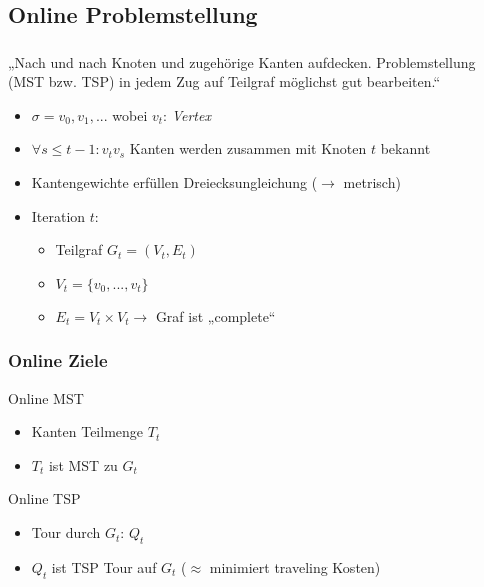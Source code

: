 \subsection{Online Problemstellung}

\begin{frame}
    \frametitle{\insertsubsection}
    „Nach und nach Knoten und zugehörige Kanten aufdecken. Problemstellung (MST bzw. TSP) in jedem Zug auf Teilgraf möglichst gut bearbeiten.“
    \vspace{1em}
    \begin{itemize}
        \itemsep\setlength{.8em}
        \item $\sigma = v_0, v_1, ...$ wobei $v_t$: \emph{Vertex}
        \item $\forall s \leq t-1: v_tv_s$ Kanten werden zusammen mit Knoten $t$ bekannt
        \item Kantengewichte erfüllen Dreiecksungleichung ($\rightarrow$ metrisch)
        \item Iteration $t$:
        \vspace{.4em}
        \begin{itemize}
            \itemsep\setlength{.4em}
            \item Teilgraf $G_t = (V_t, E_t)$ 
            \item $V_t = \{v_0,...,v_t\}$
            \item $E_t = V_t \times V_t \rightarrow$ Graf ist „complete“
        \end{itemize}
    \end{itemize}
\end{frame}

\begin{frame}
    \frametitle{Online Ziele}
    \begin{block}{Online MST}
        \vspace{1em}
        \begin{itemize}
            \itemsep\setlength{.8em}
            \item Kanten Teilmenge $T_t$
            \item $T_t$ ist MST zu $G_t$
        \end{itemize}
        \vspace{.5em}
    \end{block}
    \vspace{1em}
    \begin{block}{Online TSP}
        \vspace{1em}
        \begin{itemize}
            \itemsep\setlength{.8em}
            \item Tour durch $G_t$: $Q_t$
            \item $Q_t$ ist TSP Tour auf $G_t$ ($\approx$ minimiert traveling Kosten)
        \end{itemize}
        \vspace{.5em}
    \end{block}
\end{frame}

